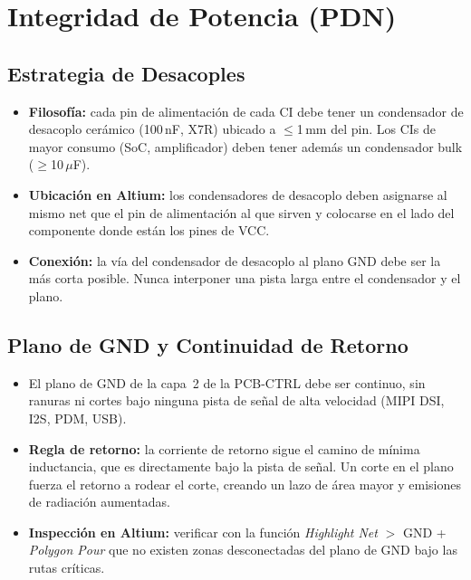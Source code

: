 \section{Integridad de Potencia (PDN)}
\label{sec:si_pdn}

\subsection{Estrategia de Desacoples}

\begin{sibox}
  \begin{itemize}
    \item \textbf{Filosofía:} cada pin de alimentación de cada CI debe tener un
      condensador de desacoplo cerámico (100\,nF, X7R) ubicado a $\leq$1\,mm
      del pin. Los CIs de mayor consumo (SoC, amplificador) deben tener además
      un condensador bulk ($\geq$10\,$\mu$F).
    \item \textbf{Ubicación en Altium:} los condensadores de desacoplo deben
      asignarse al mismo net que el pin de alimentación al que sirven y colocarse
      en el lado del componente donde están los pines de VCC.
    \item \textbf{Conexión:} la vía del condensador de desacoplo al plano GND
      debe ser la más corta posible. Nunca interponer una pista larga entre el
      condensador y el plano.
  \end{itemize}
\end{sibox}

\subsection{Plano de GND y Continuidad de Retorno}

\begin{sibox}
  \begin{itemize}
    \item El plano de GND de la capa~2 de la PCB-CTRL debe ser continuo,
      sin ranuras ni cortes bajo ninguna pista de señal de alta velocidad
      (MIPI DSI, I2S, PDM, USB).
    \item \textbf{Regla de retorno:} la corriente de retorno sigue el camino
      de mínima inductancia, que es directamente bajo la pista de señal.
      Un corte en el plano fuerza el retorno a rodear el corte, creando un
      lazo de área mayor y emisiones de radiación aumentadas.
    \item \textbf{Inspección en Altium:} verificar con la función
      \textit{Highlight Net} $>$ GND + \textit{Polygon Pour} que no existen
      zonas desconectadas del plano de GND bajo las rutas críticas.
  \end{itemize}
\end{sibox}


